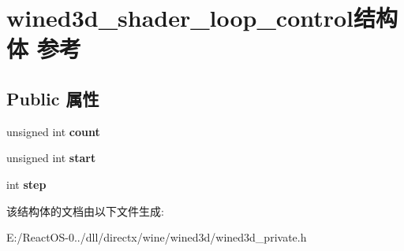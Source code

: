 \hypertarget{structwined3d__shader__loop__control}{}\section{wined3d\+\_\+shader\+\_\+loop\+\_\+control结构体 参考}
\label{structwined3d__shader__loop__control}
\subsection*{Public 属性}
\begin{DoxyCompactItemize}
\item 
\mbox{\label{structwined3d__shader__loop__control_a808b5a7390976dcfc276bf0f008631ec}} 
unsigned int {\bfseries count}
\item 
\mbox{\label{structwined3d__shader__loop__control_ad19e9024986858a0ac0305c8532f7406}} 
unsigned int {\bfseries start}
\item 
\mbox{\label{structwined3d__shader__loop__control_a4ef77da1f511422b5c6498ef48e1e958}} 
int {\bfseries step}
\end{DoxyCompactItemize}


该结构体的文档由以下文件生成\+:\begin{DoxyCompactItemize}
\item 
E\+:/\+React\+O\+S-\/0../dll/directx/wine/wined3d/wined3d\+\_\+private.\+h\end{DoxyCompactItemize}
